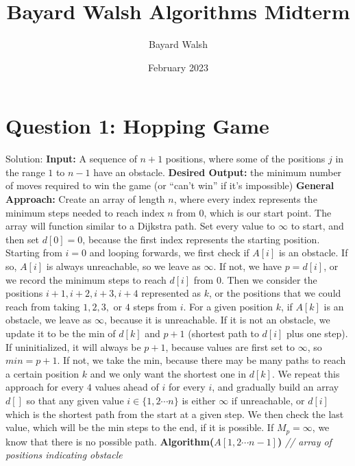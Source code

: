 \documentclass{article}
\title{Bayard Walsh Algorithms Midterm}
\author{Bayard Walsh}
\date{February 2023}
\begin{document}
\maketitle

\section{Question 1: Hopping Game}
Solution: \newline 
\textbf{Input:} A sequence of $n+1$ positions, where some of the positions $j$ in the range $1$ to $n-1$ have an obstacle.\newline\newline
\textbf{Desired Output:} the minimum number of moves required to win the game (or “can’t win” if it’s impossible)  \newline \newline
\textbf{General Approach:} Create an array of length $n$, where every index represents the minimum steps needed to reach index $n$ from $0$, which is our start point. The array will function similar to a Dijkstra path. Set every value to $\infty$ to start, and then set $d[0]=0$, because the first index represents the starting position. Starting from $i=0$ and looping forwards, we first check if $A[i]$ is an obstacle. If so, $A[i]$ is always unreachable, so we leave as $\infty$. If not, we have $p=d[i]$, or we record the minimum steps to reach $d[i]$ from $0$. Then we consider the positions $i+1,i+2,i+3,i+4$ represented as $k$, or the positions that we could reach from taking $1,2,3,$ or $4$ steps from $i$. For a given position $k$, if $A[k]$ is an obstacle, we leave as $\infty$, because it is unreachable. If it is not an obstacle, we update it to be the min of $d[k]$ and $p+1$ (shortest path to $d[i]$ plus one step). If uninitialized, it will always be $p+1$, because values are first set to $\infty$, so $min=p+1$. If not, we take the min, because there may be many paths to reach a certain position $k$ and we only want the shortest one in $d[k]$. We repeat this approach for every $4$ values ahead of $i$ for every $i$, and gradually build an array $d[]$ so that any given value $i \in \{1, 2 \cdots n \}$ is either $\infty$ if unreachable, or $d[i]$ which is the shortest path from the start at a given step. We then check the last value, which will be the min steps to the end, if it is possible. If $M_p= \infty$, we know that there is no possible path. \newline \newline
\textbf{Algorithm($A[1, 2 \cdots n-1 ]$)} \textit{// array of positions indicating obstacle}\newline
\end{document}
